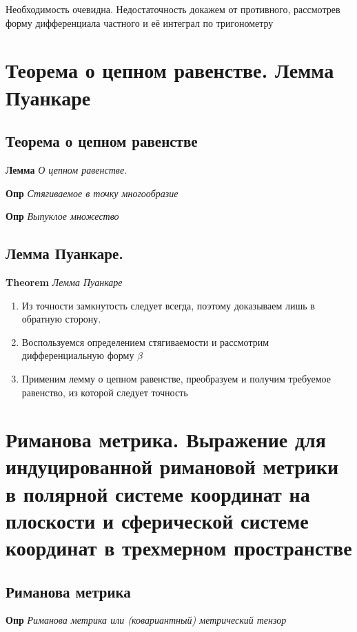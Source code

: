\documentclass[a4paper, 14pt]{article}
\begin{document}
    Необходимость очевидна.
    Недостаточность докажем от противного, рассмотрев форму дифференциала частного и её интеграл по тригонометру
    
    \section{Теорема о цепном равенстве.
    Лемма Пуанкаре}
    
    \subsection{Теорема о цепном равенстве}
    
    \textbf{Лемма} \textit{О цепном равенстве.}
    
    \textbf{Опр} \textit{Стягиваемое в точку многообразие}
    
    \textbf{Опр} \textit{Выпуклое множество}
    
    \subsection{Лемма Пуанкаре.}
    
    \textbf{Theorem} \textit{Лемма Пуанкаре}
    
    \begin{enumerate}
        \item Из точности замкнутость следует всегда, поэтому доказываем лишь в обратную сторону.
        \item Воспользуемся определением стягиваемости и рассмотрим дифференциальную форму $\beta$
        \item Применим лемму о цепном равенстве, преобразуем и получим требуемое равенство, из которой следует точность
    \end{enumerate}
    
    \section{Риманова метрика.
    Выражение для индуцированной римановой метрики в полярной системе координат на плоскости и сферической системе
    координат в трехмерном пространстве}
    
    \subsection{Риманова метрика}
    
    \textbf{Опр} \textit{Риманова метрика или (ковариантный) метрический тензор}
    
\end{document}
